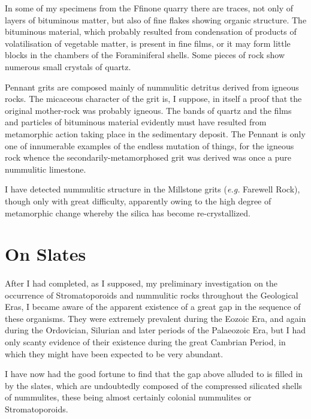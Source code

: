 \documentclass[a4paper, 12pt, oneside]{article}
\begin{document}
In some of my specimens from the Ffinone quarry there are traces, not only of layers of bituminous matter, but also of fine flakes showing organic structure. The bituminous material, which probably resulted from condensation of products of volatilisation of vegetable matter, is present in fine films, or it may form little blocks in the chambers of the Foraminiferal shells. Some pieces of rock show numerous small crystals of quartz.

Pennant grits are composed mainly of nummulitic detritus derived from igneous rocks. The micaceous character of the grit is, I suppose, in itself a proof that the original mother-rock was probably igneous. The bands of quartz and the films and particles of bituminous material evidently must have resulted from metamorphic action taking place in the sedimentary deposit. The Pennant is only one of innumerable examples of the endless mutation of things, for the igneous rock whence the secondarily-metamorphosed grit was derived was once a pure nummulitic limestone.

I have detected nummulitic structure in the Millstone grits (\emph{e.g.} Farewell Rock), though only with great difficulty, apparently owing to the high degree of metamorphic change whereby the silica has become re-crystallized.
\clearpage
\section{On Slates}
\paragraph{}
After I had completed, as I supposed, my preliminary investigation on the occurrence of Stromatoporoids and nummulitic rocks throughout the Geological Eras, I became aware of the apparent existence of a great gap in the sequence of these organisms. They were extremely prevalent during the Eozoic Era, and again during the Ordovician, Silurian and later periods of the Palaeozoic Era, but I had only scanty evidence of their existence during the great Cambrian Period, in which they might have been expected to be very abundant.

I have now had the good fortune to find that the gap above alluded to is filled in by the slates, which are undoubtedly composed of the compressed silicated shells of nummulites, these being almost certainly colonial nummulites or Stromatoporoids.
\end{document}
